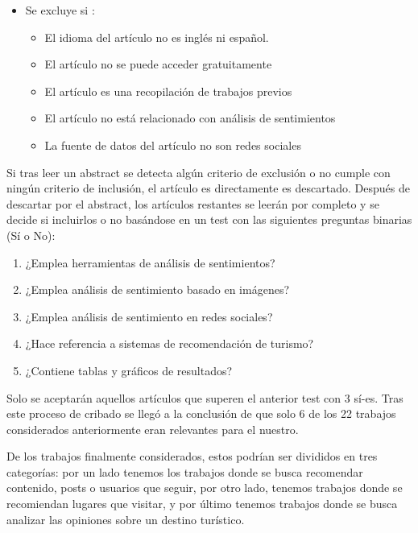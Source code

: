 \begin{enumerate}
\begin{itemize}
        \item Se excluye si :
        \begin{itemize}
            \item El idioma del artículo no es inglés ni español.
            \item El artículo no se puede acceder gratuitamente
            \item El artículo es una recopilación de trabajos previos
            \item El artículo no está relacionado con análisis de sentimientos
            \item La fuente de datos del artículo no son redes sociales
        \end{itemize}
    \end{itemize}

    Si tras leer un abstract se detecta algún criterio de exclusión o no cumple con ningún criterio de inclusión, el artículo es directamente es descartado. Después de descartar por el abstract, los artículos restantes se leerán por completo y se decide si incluirlos o no basándose en un test con las siguientes preguntas binarias (Sí o No):

    \begin{enumerate}
        \item ¿Emplea herramientas de análisis de sentimientos?
        \item ¿Emplea análisis de sentimiento basado en imágenes?
        \item ¿Emplea análisis de sentimiento en redes sociales?
        \item ¿Hace referencia a sistemas de recomendación de turismo?
        \item ¿Contiene tablas y gráficos de resultados?
    \end{enumerate}
    
    Solo se aceptarán aquellos artículos que superen el anterior test con 3 sí-es. Tras este proceso de cribado se llegó a la conclusión de que solo 6 de los 22 trabajos considerados anteriormente eran relevantes para el nuestro.
\end{enumerate}

De los trabajos finalmente considerados, estos podrían ser divididos en tres categorías: por un lado tenemos los trabajos donde se busca recomendar contenido, posts o usuarios que seguir, por otro lado, tenemos trabajos donde se recomiendan lugares que visitar, y por último tenemos trabajos donde se busca analizar las opiniones sobre un destino turístico.\\

